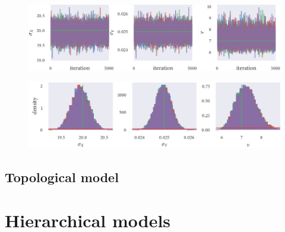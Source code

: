 \begin{figure}
    \includegraphics{stan_gauss_trace.pdf}
    \caption{}
\end{figure}

\begin{figure}
    \includegraphics{stan_gauss_hist.pdf}
    \caption{}
\end{figure}

\subsection{Topological model}

\section{Hierarchical models}
